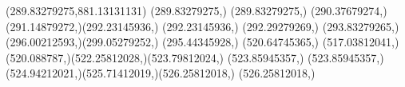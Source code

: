 {{	\lineto(289.83279275,881.13131131)
	\closepath
	\moveto(289.83279275,)
	\lineto(289.83279275,)
	\curveto(290.37679274,)(291.14879272,)(292.23145936,)
	\lineto(292.23145936,)
	\lineto(292.29279269,)
	\curveto(293.83279265,)(296.00212593,)(299.05279252,)
	\lineto(295.44345928,)
	\closepath
	\moveto(520.64745365,)
	\lineto(517.03812041,)
	\curveto(520.088787,)(522.25812028,)(523.79812024,)
	\lineto(523.85945357,)
	\lineto(523.85945357,)
	\curveto(524.94212021,)(525.71412019,)(526.25812018,)
	\lineto(526.25812018,)
	\closepath
}
}
